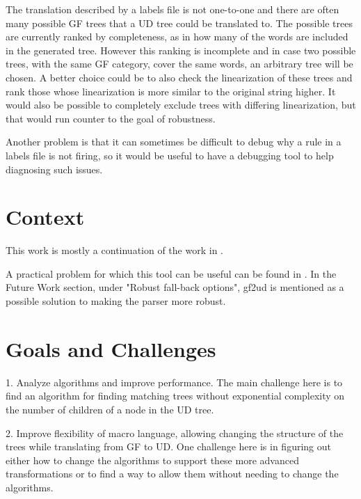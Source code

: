 \documentclass{article}
\begin{document}
The translation described by a labels file is not one-to-one and there are often many possible GF trees that a UD tree could be translated to. The possible trees are currently ranked by completeness, as in how many of the words are included in the generated tree. However this ranking is incomplete and in case two possible trees, with the same GF category, cover the same words, an arbitrary tree will be chosen. A better choice could be to also check the linearization of these trees and rank those whose linearization is more similar to the original string higher. It would also be possible to completely exclude trees with differing linearization, but that would run counter to the goal of robustness.

Another problem is that it can sometimes be difficult to debug why a rule in a labels file is not firing, so it would be useful to have a debugging tool to help diagnosing such issues.

\section{Context}

This work is mostly a continuation of the work in \cite{kolachina-ranta-2017}.

A practical problem for which this tool can be useful can be found in \cite{listenmaa-etal-2021-towards}. In the Future Work section, under "Robust fall-back options", gf2ud is mentioned as a possible solution to making the parser more robust.



\section{Goals and Challenges}

1. Analyze algorithms and improve performance. The main challenge here is to find an algorithm for finding matching trees without exponential complexity on the number of children of a node in the UD tree.

2. Improve flexibility of macro language, allowing changing the structure of the trees while translating from GF to UD. One challenge here is in figuring out either how to change the algorithms to support these more advanced transformations or to find a way to allow them without needing to change the algorithms.
\end{document}
